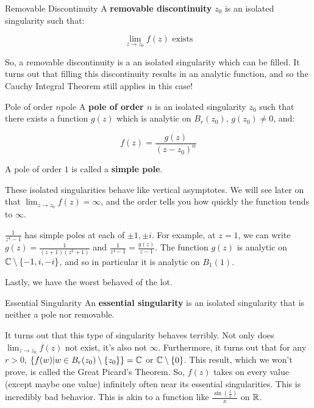 \begin{defbo}{Removable Discontinuity}{} A {\bf removable discontinuity} $z_0$ is an isolated singularity such that:

$$\lim_{z\rightarrow z_0} f(z)\text{ exists}$$
\end{defbo}

So, a removable discontinuity is a an isolated singularity which can be filled. It turns out that filling this discontinuity results in an analytic function, and so the Cauchy Integral Theorem still applies in this case!

\begin{defbo}{Pole of order $n$}{pole} A {\bf pole of order $n$} is an isolated singularity $z_0$ such that there exists a function $g(z)$ which is analytic on $B_r(z_0)$, $g(z_0)\ne 0$, and:

$$f(z) = \frac{g(z)}{(z-z_0)^n}$$

A pole of order $1$ is called a {\bf simple pole}.
\end{defbo}

These isolated singularities behave like vertical asymptotes. We will see later on that $\lim_{z\rightarrow z_0}f(z) = \infty$, and the order tells you how quickly the function tends to $\infty$.

\begin{ex}{}{}$\frac{1}{z^4 - 1}$ has simple poles at each of $\pm1, \pm i$. For example, at $z = 1$, we can write $g(z) = \frac{1}{(z+1)(z^2 + 1)}$ and $\frac{1}{z^4 - 1} = \frac{g(z)}{z-1}$. The function $g(z)$ is analytic on $\mathbb{C}\setminus \{-1,i,-i\}$, and so in particular it is analytic on $B_1(1)$.
\end{ex}

Lastly, we have the worst behaved of the lot.

\begin{defbo}{Essential Singularity}{} An {\bf essential singularity} is an isolated singularity that is neither a pole nor removable.\end{defbo}

It turns out that this type of singularity behaves terribly. Not only does $\lim_{z\rightarrow z_0}f(z)$ not exist, it's also not $\infty$. Furthermore, it turns out that for any $r > 0$, $\{f(w)|w\in B_r(z_0)\setminus\{z_0\}\} = \mathbb{C}$ or $\mathbb{C}\setminus\{0\}$. This result, which we won't prove, is called the Great Picard's Theorem. So, $f(z)$ takes on every value (except maybe one value) infinitely often near its essential singularities. This is incredibly bad behavior. This is akin to a function like $\frac{\sin\left(\frac{1}{x}\right)}{x}$ on $\mathbb{R}$.

